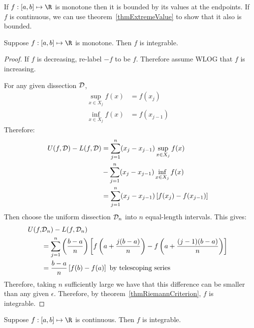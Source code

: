 \documentclass[../Main.tex]{subfiles}
\begin{document}
\begin{remark}
    If $f : [a, b] \mapsto \R$ is monotone then it is bounded by its values at the endpoints. If $f$ is continuous, we can use theorem~\ref{thmExtremeValue} to show that it also is bounded.
\end{remark}
\begin{theorem}
    Suppose $f : [a, b] \mapsto \R$ is monotone. Then $f$ is integrable.
    \label{thmFMonotoneImpliesIntegrable}
\end{theorem}
\begin{proof}
    If $f$ is decreasing, re-label $-f$ to be $f$. Therefore assume WLOG that $f$ is increasing.
    
    For any given dissection $\mathcal{D}$,
    \begin{align*}
        \sup_{x \in X_j} f(x) &= f(x_j) \\
        \inf_{x \in X_j} f(x) &= f(x_{j-1}) 
    \end{align*}
    Therefore:
    \begin{align*}
        U(f, \mathcal{D}) - L(f, \mathcal{D}) &= \sum_{j = 1}^n (x_j - x_{j - 1}) \sup_{x \in X_j} f(x) \\
        &- \sum_{j = 1}^n (x_j - x_{j - 1}) \inf_{x \in X_j} f(x) \\
        &= \sum_{j = 1}^n (x_j - x_{j - 1}) \left[f(x_j) - f(x_{j - 1})\right]
    \end{align*}
    Then choose the uniform dissection $\mathcal{D}_n$ into $n$ equal-length intervals. This gives:
    \begin{align*}
        U(f, &\mathcal{D}_n) - L(f, \mathcal{D}_n) \\
        &= \sum_{j = 1}^n \left(\frac{b - a}{n}\right) \left[f\left(a + \frac{j(b - a)}{n}\right) - f\left(a + \frac{(j - 1)(b - a)}{n}\right)\right] \\
        &= \frac{b - a}{n} \left[f(b) - f(a)\right] \text{ by telescoping series}
    \end{align*}
    Therefore, taking $n$ sufficiently large we have that this difference can be smaller than any given $\epsilon$. Therefore, by theorem~\ref{thmRiemannCriterion}, $f$ is integrable.
\end{proof}
\begin{theorem}
    Suppose $f : [a, b] \mapsto \R$ is continuous. Then $f$ is integrable.
    \label{thmFCTSImpliesIntegrable}
\end{theorem}
\end{document}
